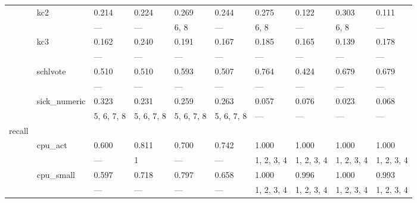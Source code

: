 \documentclass{article}
\begin{document}
\begin{center}
\begin{longtable}{p{1.2cm}p{1.8cm}p{1cm}p{1cm}p{1cm}p{1cm}p{1cm}p{1cm}p{1cm}p{1cm}}
             & kc2          & 0.214            & 0.224         & 0.269         & 0.244         & 0.275         & 0.122      & 0.303            & 0.111         \\
             &              & ---              & ---           & 6, 8          & ---           & 6, 8          & ---        & 6, 8             & ---           \\
             & kc3          & 0.162            & 0.240         & 0.191         & 0.167         & 0.185         & 0.165      & 0.139            & 0.178         \\
             &              & ---              & ---           & ---           & ---           & ---           & ---        & ---              & ---           \\
             & schlvote     & 0.510            & 0.510         & 0.593         & 0.507         & 0.764         & 0.424      & 0.679            & 0.679         \\
             &              & ---              & ---           & ---           & ---           & ---           & ---        & ---              & ---           \\
             & sick\_numeric & 0.323            & 0.231         & 0.259         & 0.263         & 0.057         & 0.076      & 0.023            & 0.068         \\
             &              & 5, 6, 7, 8       & 5, 6, 7, 8    & 5, 6, 7, 8    & 5, 6, 7, 8    & ---           & ---        & ---              & ---           \\
 recall      &              &                  &               &               &               &               &            &                  &               \\
             & cpu\_act      & 0.600            & 0.811         & 0.700         & 0.742         & 1.000         & 1.000      & 1.000            & 1.000         \\
             &              & ---              & 1             & ---           & ---           & 1, 2, 3, 4    & 1, 2, 3, 4 & 1, 2, 3, 4       & 1, 2, 3, 4    \\
             & cpu\_small    & 0.597            & 0.718         & 0.797         & 0.658         & 1.000         & 0.996      & 1.000            & 0.993         \\
             &              & ---              & ---           & ---           & ---           & 1, 2, 3, 4    & 1, 2, 3, 4 & 1, 2, 3, 4       & 1, 2, 3, 4    \\

\end{longtable}
\end{center}
\end{document}

